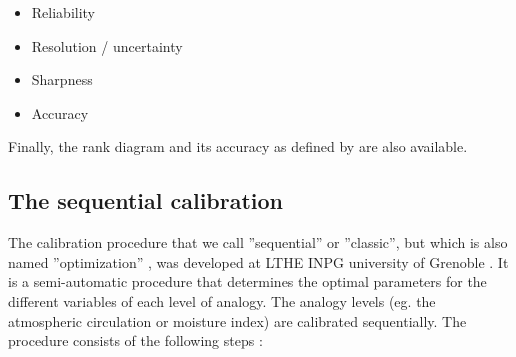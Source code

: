 \documentclass[review]{elsarticle}
\begin{document}
\begin{itemize}
	\setlength\itemsep{-1mm}
	\item Reliability \citep{Hersbach2000}
	\item Resolution / uncertainty \citep{Hersbach2000}
	\item Sharpness \citep{Bontron2004}
	\item Accuracy \citep{Bontron2004}
\end{itemize}

Finally, the rank diagram \citep{Talagrand1997} and its accuracy as defined by \citet{Candille2005} are also available.


\subsection{The sequential calibration}
\label{sec:atmoswing-calibration}

The calibration procedure that we call ''sequential'' or ''classic'', but which is also named ''optimization'' \cite[eg. by ][]{BenDaoud2015}, was developed at LTHE \textendash INPG university of Grenoble \citep{Bontron2004}. It is a semi-automatic procedure that determines the optimal parameters for the different variables of each level of analogy. The analogy levels (eg. the atmospheric circulation or moisture index) are calibrated sequentially. The procedure consists of the following steps \citep{Bontron2004}:
\end{document}
